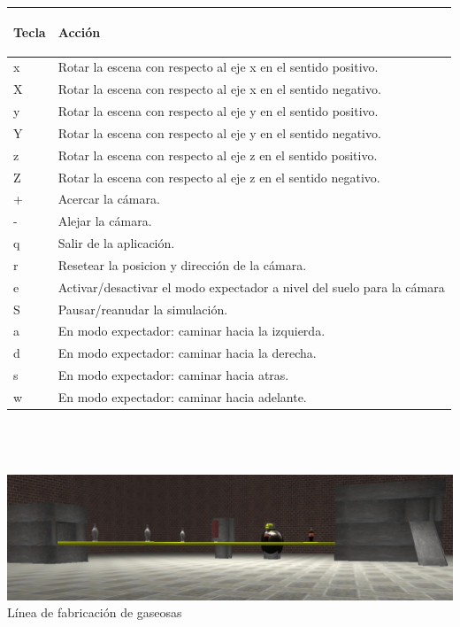 \documentclass[11pt]{article}
\begin{document}
    \begin{tabular}{|| l | l ||}
      \hline
      \begin{large}Tecla\end{large} & 
	\begin{large}Acci\'{o}n \end{large} \\
          \hline
x & Rotar la escena con respecto al eje x en el sentido positivo. \\
X & Rotar la escena con respecto al eje x en el sentido negativo. \\
y & Rotar la escena con respecto al eje y en el sentido positivo. \\
Y & Rotar la escena con respecto al eje y en el sentido negativo. \\
z & Rotar la escena con respecto al eje z en el sentido positivo. \\
Z & Rotar la escena con respecto al eje z en el sentido negativo.  \\
+ & Acercar la cámara.  \\
- & Alejar la cámara.  \\
q & Salir de la aplicaci\'on.  \\
r & Resetear la posicion y dirección de la cámara.  \\
e & Activar/desactivar el modo expectador a nivel del suelo para la cámara  \\
S & Pausar/reanudar la simulación.  \\
a & En modo expectador: caminar hacia la izquierda.  \\
d & En modo expectador: caminar hacia la derecha.  \\
s & En modo expectador: caminar hacia atras.  \\
w & En modo expectador: caminar hacia adelante.  \\
          \hline
    \end{tabular}
\\ \\ \\
\includegraphics[scale=0.5]{total} \\ Línea de fabricación de gaseosas  \\ \\
\end{document}
